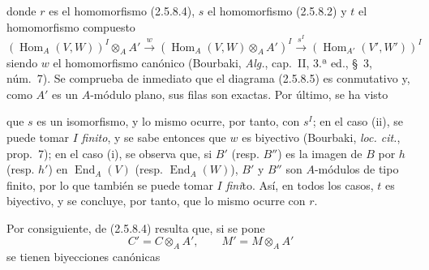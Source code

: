 donde $r$ es el homomorfismo (2.5.8.4), $s$ el homomorfismo (2.5.8.2) y
$t$ el homomorfismo compuesto
\[
(\operatorname{Hom}_A(V,W))^I\otimes_A A'
\xrightarrow{w}(\operatorname{Hom}_A(V,W)\otimes_A A')^I
\xrightarrow{s^I}(\operatorname{Hom}_{A'}(V',W'))^I
\]
siendo $w$ el homomorfismo canónico (Bourbaki, \emph{Alg.}, cap.~II,
3.ª ed., \S~3, núm.~7). Se comprueba de
inmediato que el diagrama (2.5.8.5) es conmutativo y, como $A'$ es un
$A$-módulo plano, sus filas son exactas. Por último, se ha visto

que $s$ es un isomorfismo, y lo mismo ocurre, por tanto, con $s^I$; en el caso
(ii), se puede tomar $I$ \emph{finito}, y se sabe entonces que $w$ es biyectivo
(Bourbaki, \emph{loc. cit.}, prop.~7); en el caso (i), se observa que, si $B'$
(resp. $B''$) es la imagen de $B$ por $h$ (resp. $h'$) en
$\operatorname{End}_A(V)$ (resp. $\operatorname{End}_A(W)$), $B'$ y $B''$
son $A$-módulos de tipo finito, por lo que también se puede tomar $I$ \emph{fini}to.
Así, en todos los casos, $t$ es biyectivo, y se concluye, por tanto, que lo
mismo ocurre con $r$.

Por consiguiente, de (2.5.8.4) resulta que, si se pone
\[
C'=C\otimes_A A',\qquad M'=M\otimes_A A'
\]
se tienen biyecciones canónicas

